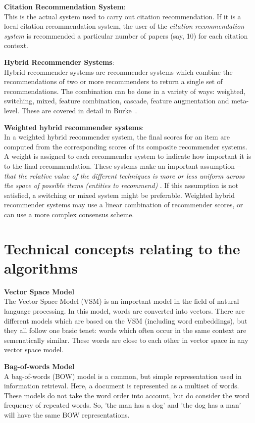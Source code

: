 \textbf{Citation Recommendation System}:\\
This is the actual system used to carry out citation recommendation. If it is a local citation recommendation system, the user of the \textit{citation recommendation system} is recommended a particular number of papers (say, 10) for each citation context.

\textbf{Hybrid Recommender Systems}:\\
Hybrid recommender systems are recommender systems which combine the recommendations of two or more recommenders to return a single set of recommendations.
The combination can be done in a variety of ways: weighted, switching, mixed, feature combination, cascade, feature augmentation and meta-level. These are covered in detail in Burke~\cite{Burke2002}.

\textbf{Weighted hybrid recommender systems}:\\
In a weighted hybrid recommender system, the final scores for an item are computed from the corresponding scores of its composite recommender systems. A weight is assigned to each recommender system to indicate how important it is to the final recommendation. These systems make an important assumption -- \textit{that the relative value of the different techniques is more or less uniform across the space of possible items (entities to recommend)} \cite{Burke2002}. If this assumption is not satisfied, a switching or mixed system might be preferable.
Weighted hybrid recommender systems may use a linear combination of recommender scores, or can use a more complex consensus scheme.


\section{Technical concepts relating to the algorithms}

\textbf{Vector Space Model}\\
The Vector Space Model (VSM) is an important model in the field of natural language processing. In this model, words are converted into vectors. There are different models which are based on the VSM (including word embeddings), but they all follow one basic tenet: words which often occur in the same context are semenatically similar. These words are close to each other in vector space in any vector space model.

\textbf{Bag-of-words Model}\\
A bag-of-words (BOW) model is a common, but simple representation used in information retrieval. Here, a document is represented as a multiset of words. These models do not take the word order into account, but do consider the word frequency of repeated words. So, 'the man has a dog' and 'the dog has a man' will have the same BOW representations.

